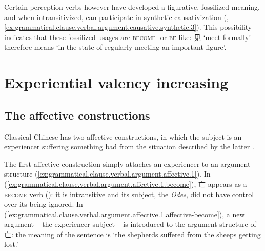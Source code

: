 \documentclass[UTF8, a4paper, oneside, scheme=plain, 12pt]{ctexrep}
\newcommand*{\citepages}[1]{pp.~{#1}}
\newcommand{\work}[1]{\textit{#1}}
\newcommand{\translate}[1]{`#1'}
\newcommand*{\category}[1]{\textsc{#1}}
\begin{document}
Certain perception verbs however have developed a figurative, fossilized meaning,
and when intransitivized, can participate in synthetic causativization
(,
\ref{ex:grammatical.clause.verbal.argument.causative.synthetic.3}).
This possibility indicates that these fossilized usages are \category{become}- or \category{be}-like:
见 \translate{meet formally} therefore means \translate{in the state of regularly meeting an important figure}.




\section{Experiential valency increasing}

\subsection{The affective constructions}

Classical Chinese has two affective constructions,
in which the subject is an experiencer suffering something bad from the situation described by the latter
\citep[\citepages{354-358}]{meiguang2018}.

The first affective construction simply attaches an experiencer to an argument structure
(\ref{ex:grammatical.clause.verbal.argument.affective.1}).
In (\ref{ex:grammatical.clause.verbal.argument.affective.1.become}),
亡 appears as a \category{become} verb ():
it is intransitive and its subject, the \work{Odes}, did not have control over its being ignored.
In (\ref{ex:grammatical.clause.verbal.argument.affective.1.affective-become}),
a new argument -- the experiencer subject -- is introduced to the argument structure of 亡:
the meaning of the sentence is \translate{the shepherds suffered from the sheeps getting lost.}
\end{document}
